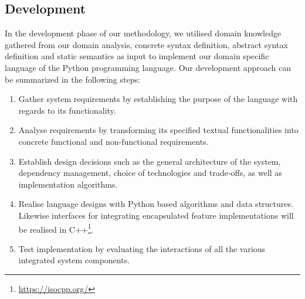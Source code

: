 \documentclass[conference]{IEEEtran}
\newcommand{\foot}[1]{\footnote{\url{#1}}}
\begin{document}
\subsection{Development}
In the development phase of our methodology, we utilised domain knowledge gathered from our domain analysis, concrete syntax definition, abstract syntax definition and static semantics as input to implement our domain specific language of the Python programming language. Our development approach can be summarized in the following steps:
\begin{enumerate}
    \item Gather system requirements by establishing the purpose of the language with regards to its functionality.
    \item Analyse requirements by transforming its specified textual functionalities into concrete functional and non-functional requirements.
    \item Establish design decisions such as the general architecture of the system, dependency management, choice of technologies and trade-offs, as well as implementation algorithms.
    \item Realise language designs with Python based algorithms and data structures. Likewise interfaces for integrating encapsulated feature implementations will be realised in  C++\foot{https://isocpp.org/}.
    \item Test implementation by evaluating the interactions of all the various integrated system components.
 \end{enumerate}
 
\end{document}
